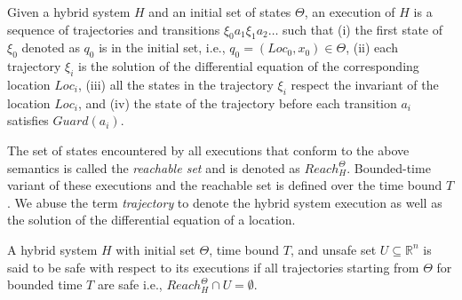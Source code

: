 \vspace{0.2cm}
\begin{definition}
\label{def:hybridExecution}
Given a hybrid system $H$ and an initial set of states $\Theta$, an execution of $H$ is a sequence of trajectories and transitions $\xi_0 a_1 \xi_1 a_2 \ldots $ such that
%
(i) the first state of $\xi_0$ denoted as $q_0$ is in the initial set, i.e., $q_0 = (Loc_0, x_0)\in \Theta$,
%
(ii) each trajectory $\xi_i$ is the solution of the differential equation of the corresponding location $Loc_i$, 
%
(iii) all the states in the trajectory $\xi_i$ respect the invariant of the location $Loc_i$,
%
and (iv) the state of the trajectory before each transition $a_i$ satisfies $Guard(a_i)$.
\end{definition}
%
The set of states encountered by all executions that conform to the above semantics is called the \emph{reachable set} and is denoted as $Reach_{H}^{\Theta}$. Bounded-time variant of these executions and the reachable set is defined over the time bound $T$. We abuse the term \emph{trajectory} to denote the hybrid system execution as well as the solution of the differential equation of a location.

\vspace{0.2cm}
\begin{definition}
\label{def:hybridSafe}
A hybrid system $H$ with initial set $\Theta$, time bound $T$, and unsafe set $U \subseteq \mathbb{R}^n$ is said to be safe with respect to its executions if all trajectories starting from $\Theta$ for bounded time $T$ are safe i.e., $Reach_{H}^{\Theta} \cap U = \emptyset$.
\end{definition}



